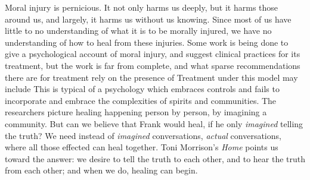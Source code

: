 \documentclass[12pt]{article}
\begin{document}
Moral injury is pernicious. It not only harms us deeply, but it harms those
around us, and largely, it harms us without us knowing. Since most of us have
little to no understanding of what it is to be morally injured, we have no
understanding of how to heal from these injuries. Some work is being done to
give a psychological account of moral injury, and suggest clinical practices
for its treatment,\autocite{psych} but the work is far from complete, and what
sparse recommendations there are for treatment rely on the presence of
\autocite[\S 7.2]{psych} Treatment under this
model may include \autocite[\S 7.2.5]{psych} This is typical of a psychology
which embraces controls and fails to incorporate and embrace the complexities
of spirits and communities. The researchers picture healing happening person by
person, by imagining a community. But can we believe that Frank would heal, if
he only \emph{imagined} telling the truth? We need instead of \emph{imagined}
conversations, \emph{actual} conversations, where all those effected can heal
together. Toni Morrison's \emph{Home} points us toward the answer: we desire to
tell the truth to each other, and to hear the truth from each other; and when
we do, healing can begin.



\clearpage
\printbibliography
\end{document}
